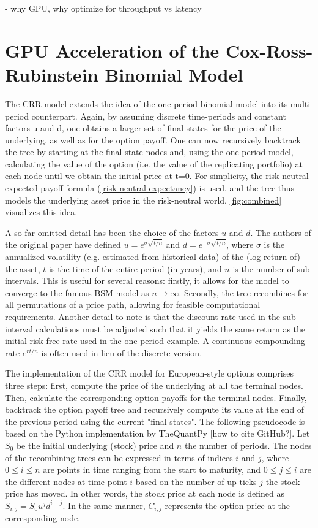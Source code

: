 \documentclass[english,12pt,a4paper,pdftex,sci,utf8]{aaltothesis}
\begin{document}
- why GPU, why optimize for throughput vs latency


\clearpage

\section{GPU Acceleration of the Cox-Ross-Rubinstein Binomial Model} \label{sec:gpu-crr}

The CRR model extends the idea of the one-period binomial model into its multi-period counterpart. Again, by assuming discrete time-periods and constant factors u and d, one obtains a larger set of final states for the price of the underlying, as well as for the option payoff. One can now recursively backtrack the tree by starting at the final state nodes and, using the one-period model, calculating the value of the option (i.e. the value of the replicating portfolio) at each node until we obtain the initial price at t=0. For simplicity, the risk-neutral expected payoff formula (\ref{risk-neutral-expectancy}) is used, and the tree thus models the underlying asset price in the risk-neutral world. \cref{fig:combined} visualizes this idea. \cite{cox1979option}

A so far omitted detail has been the choice of the factors $u$ and $d$. The authors of the original paper have defined $u = e^{\sigma\sqrt{t/n}}$ and $d = e^{-\sigma\sqrt{t/n}}$, where $\sigma$ is the annualized volatility (e.g. estimated from historical data) of the (log-return of) the asset, $t$ is the time of the entire period (in years), and $n$ is the number of sub-intervals. This is useful for several reasons: firstly, it allows for the model to converge to the famous BSM model as $n \rightarrow \infty$. Secondly, the tree recombines for all permutations of a price path, allowing for feasible computational requirements. Another detail to note is that the discount rate used in the sub-interval calculations must be adjusted such that it yields the same return as the initial risk-free rate used in the one-period example. A continuous compounding rate $e^{rt/n}$ is often used in lieu of the discrete version. \cite{cox1979option} \cite{hull2013fundamentals}

The implementation of the CRR model for European-style options comprises three steps: first, compute the price of the underlying at all the terminal nodes. Then, calculate the corresponding option payoffs for the terminal nodes. Finally, backtrack the option payoff tree and recursively compute its value at the end of the previous period using the current "final states". The following pseudocode is based on the Python implementation by TheQuantPy [how to cite GitHub?]. Let $S_0$ be the initial underlying (stock) price and $n$ the number of periods. The nodes of the recombining trees can be expressed in terms of indices $i$ and $j$, where $0 \leq i \leq n$ are points in time ranging from the start to maturity, and $0 \le j \le i$ are the different nodes at time point $i$ based on the number of up-ticks $j$ the stock price has moved. In other words, the stock price at each node is defined as $S_{i,j} = S_0u^jd^{i-j}$. In the same manner, $C_{i,j}$ represents the option price at the corresponding node.
\end{document}
